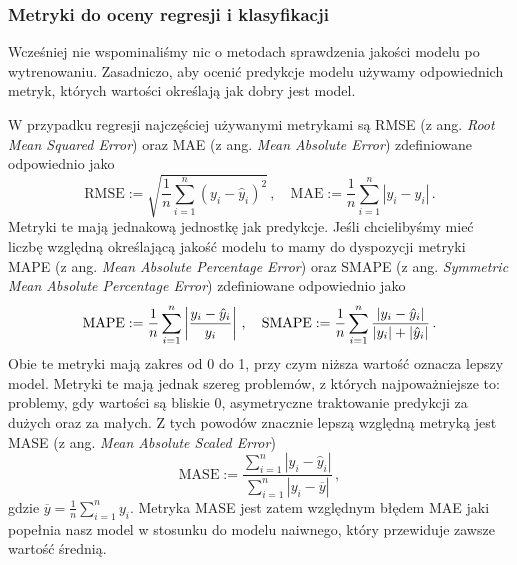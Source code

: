 \documentclass{myclass}
\numberwithin{equation}{subsection}
\begin{document}
\subsubsection{Metryki do oceny regresji i klasyfikacji}

Wcześniej nie wspominaliśmy nic o metodach sprawdzenia jakości modelu po wytrenowaniu. Zasadniczo,
aby ocenić predykcje modelu używamy odpowiednich metryk, których wartości określają jak dobry jest
model.

W przypadku regresji najczęściej używanymi metrykami są RMSE (z ang. \textit{Root Mean Squared
Error}) oraz MAE (z ang. \textit{Mean Absolute Error}) zdefiniowane odpowiednio jako
\begin{equation}
    \mathrm{RMSE} := \sqrt{\frac{1}{n}\sum_{i=1}^n (y_i - \hat{y}_i)^2}\,,\quad\mathrm{MAE} := \frac{1}{n}\sum_{i=1}^n|y_i - \hat{y}_i|\,.
\end{equation}
Metryki te mają jednakową jednostkę jak predykcje. Jeśli chcielibyśmy mieć liczbę względną
określającą jakość modelu to mamy do dyspozycji metryki MAPE (z ang. \textit{Mean Absolute
Percentage Error}) oraz SMAPE (z ang. \textit{Symmetric Mean Absolute Percentage Error})
zdefiniowane odpowiednio jako
\begin{equation}
    \mathrm{MAPE} := \frac{1}{n}\sum_{i=1}^n\left|\frac{y_i - \hat{y}_i}{y_i}\right|\,,\quad\mathrm{SMAPE} := \frac{1}{n}\sum_{i=1}^n \frac{|y_i - \hat{y}_i|}{|y_i| + |\hat{y}_i|}\,.\\
\end{equation}
Obie te metryki mają zakres od 0 do 1, przy czym niższa wartość oznacza lepszy model. Metryki te
mają jednak szereg problemów, z których najpoważniejsze to: problemy, gdy wartości są bliskie 0,
asymetryczne traktowanie predykcji za dużych oraz za małych. Z tych powodów znacznie lepszą względną
metryką jest MASE (z ang. \textit{Mean Absolute Scaled Error})
\begin{equation}
    \mathrm{MASE} := \frac{\sum_{i=1}^n |y_i - \hat{y}_i|}{\sum_{i=1}^n |y_i - \overline{y}|}\,,
\end{equation}
gdzie \(\overline{y} = \frac{1}{n}\sum_{i=1}^n y_i\). Metryka MASE jest zatem względnym błędem MAE
jaki popełnia nasz model w stosunku do modelu naiwnego, który przewiduje zawsze wartość średnią.
\end{document}
